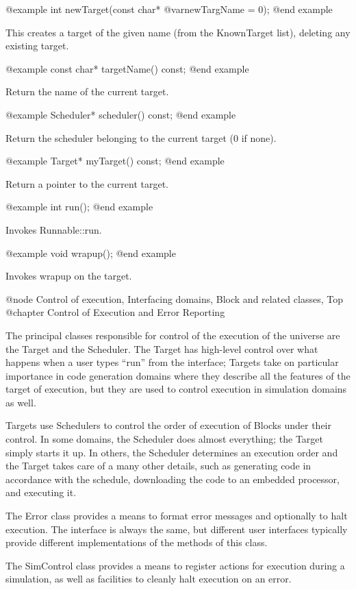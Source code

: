 @example
int newTarget(const char* @var{newTargName} = 0);
@end example

This creates a target of the given name (from the KnownTarget list),
deleting any existing target.

@example
const char* targetName() const;
@end example

Return the name of the current target.

@example
Scheduler* scheduler() const;
@end example

Return the scheduler belonging to the current target (0 if none).

@example
Target* myTarget() const;
@end example

Return a pointer to the current target.

@example
int run();
@end example

Invokes Runnable::run.

@example
void wrapup();
@end example

Invokes wrapup on the target.

@node Control of execution, Interfacing domains, Block and related classes, Top
@chapter Control of Execution and Error Reporting

The principal classes responsible for control of the execution of the
universe are the Target and the Scheduler.  The Target has high-level
control over what happens when a user types ``run'' from the interface;
Targets take on particular importance in code generation domains where
they describe all the features of the target of execution, but they
are used to control execution in simulation domains as well.

Targets use Schedulers to control the order of execution of Blocks under
their control.  In some domains, the Scheduler does almost everything;
the Target simply starts it up.  In others, the Scheduler determines
an execution order and the Target takes care of a many other
details, such as generating code in accordance with the schedule,
downloading the code to an embedded processor, and executing it.

The Error class provides a means to format error messages and optionally
to halt execution.  The interface is always the same, but different
user interfaces typically provide different implementations of the
methods of this class.

The SimControl class provides a means to register actions for execution
during a simulation, as well as facilities to cleanly halt execution
on an error.

